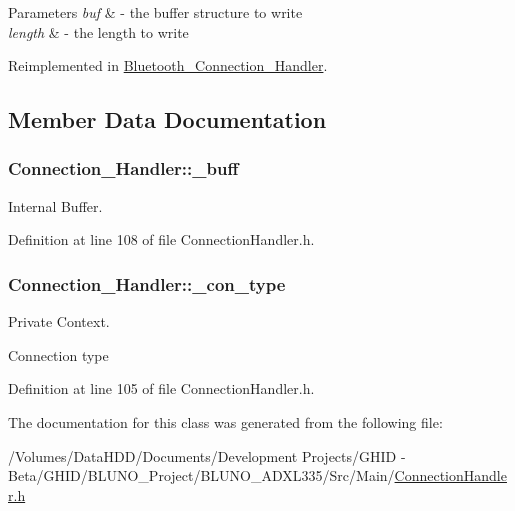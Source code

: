 \begin{DoxyParams}{\-Parameters}
{\em buf} & -\/ the buffer structure to write \\
\hline
{\em length} & -\/ the length to write \\
\hline
\end{DoxyParams}


\-Reimplemented in \hyperlink{class_bluetooth___connection___handler_a5970fc3699bcd204f256b4e9e31b4dcb}{\-Bluetooth\-\_\-\-Connection\-\_\-\-Handler}.



\subsection{\-Member \-Data \-Documentation}
\hypertarget{class_connection___handler_ad1eca58f0f8cb43147ce961389293b37}{
\subsubsection[{\-\_\-buff}]{ {\bf \-Connection\-\_\-\-Handler\-::\-\_\-buff}}}\label{class_connection___handler_ad1eca58f0f8cb43147ce961389293b37}


\-Internal \-Buffer. 



\-Definition at line 108 of file \-Connection\-Handler.\-h.

\hypertarget{class_connection___handler_a3ac7a0346fb72ae55ffa867465e397f2}{
\subsubsection[{\-\_\-con\-\_\-type}]{ {\bf \-Connection\-\_\-\-Handler\-::\-\_\-con\-\_\-type}}}\label{class_connection___handler_a3ac7a0346fb72ae55ffa867465e397f2}


\-Private \-Context. 

\-Connection type 

\-Definition at line 105 of file \-Connection\-Handler.\-h.



\-The documentation for this class was generated from the following file\-:\begin{DoxyCompactItemize}
\item 
/\-Volumes/\-Data\-H\-D\-D/\-Documents/\-Development Projects/\-G\-H\-I\-D -\/ Beta/\-G\-H\-I\-D/\-B\-L\-U\-N\-O\-\_\-\-Project/\-B\-L\-U\-N\-O\-\_\-\-A\-D\-X\-L335/\-Src/\-Main/\hyperlink{_connection_handler_8h}{\-Connection\-Handler.\-h}\end{DoxyCompactItemize}
